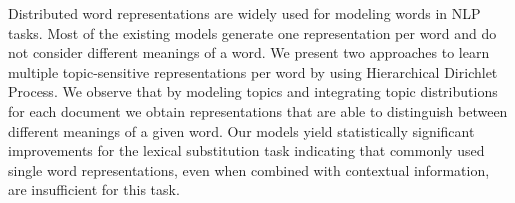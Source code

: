 Distributed word representations are widely used for modeling words in NLP tasks. Most of the existing models generate one representation per word and do not consider different meanings of a word. We present two approaches to learn multiple topic-sensitive representations per word by using Hierarchical Dirichlet Process. We observe that by modeling topics and integrating topic distributions for each document  we obtain representations that are able to distinguish between different meanings of a given word. Our models yield statistically significant improvements for the lexical substitution task indicating that commonly used single word representations, even when combined with contextual information, are insufficient for this task.
